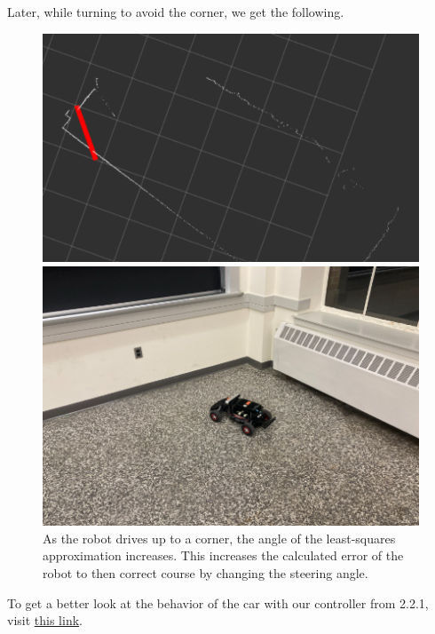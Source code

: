 \documentclass{article}
\begin{document}
Later, while turning to avoid the corner, we get the following.

\begin{figure}[!h]
   \begin{minipage}{0.53\textwidth}
     \centering
     \includegraphics[width=1.0\linewidth]{scan_turn_rviz.png}
   \end{minipage}
   \begin{minipage}{0.47\textwidth}
     \centering
     \includegraphics[width=1.0\linewidth]{scan_turn_car.png}
   \end{minipage}
   \caption{As the robot drives up to a corner, the angle of the least-squares approximation increases. This increases the calculated error of the robot to then correct course by changing the steering angle.}
\end{figure}

To get a better look at the behavior of the car with our controller from 2.2.1, visit \href{https://drive.google.com/file/d/1FpQVgkOg14kKm138I-bZFko9YBxphWZr/view?usp=drive_link}{this link}.
\end{document}

